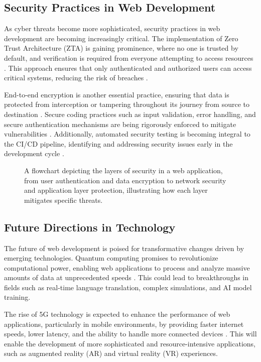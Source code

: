 \subsection{Security Practices in Web Development}
As cyber threats become more sophisticated, security practices in web development are becoming increasingly critical. The implementation of Zero Trust Architecture (ZTA) is gaining prominence, where no one is trusted by default, and verification is required from everyone attempting to access resources \cite{adams2021zerotrust}. This approach ensures that only authenticated and authorized users can access critical systems, reducing the risk of breaches \cite{lee2022security}.

End-to-end encryption is another essential practice, ensuring that data is protected from interception or tampering throughout its journey from source to destination \cite{kim2021encryption}. Secure coding practices such as input validation, error handling, and secure authentication mechanisms are being rigorously enforced to mitigate vulnerabilities \cite{garcia2023secure}. Additionally, automated security testing is becoming integral to the CI/CD pipeline, identifying and addressing security issues early in the development cycle \cite{wang2021testing}.

\begin{figure}[h]
    \centering
    \caption{A flowchart depicting the layers of security in a web application, from user authentication and data encryption to network security and application layer protection, illustrating how each layer mitigates specific threats.}
    \label{fig:security_flowchart}
\end{figure}

\subsection{Future Directions in Technology}
The future of web development is poised for transformative changes driven by emerging technologies. Quantum computing promises to revolutionize computational power, enabling web applications to process and analyze massive amounts of data at unprecedented speeds \cite{miller2022quantum}. This could lead to breakthroughs in fields such as real-time language translation, complex simulations, and AI model training.

The rise of 5G technology is expected to enhance the performance of web applications, particularly in mobile environments, by providing faster internet speeds, lower latency, and the ability to handle more connected devices \cite{doe2023fiveg}. This will enable the development of more sophisticated and resource-intensive applications, such as augmented reality (AR) and virtual reality (VR) experiences.

